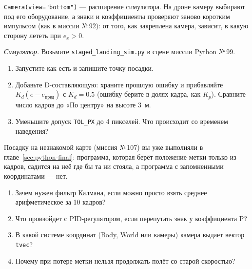 \begin{warnbox}
\verb|Camera(view="bottom")| --- расширение симулятора. На дроне камеру выбирают под его оборудование, а знаки и коэффициенты проверяют заново коротким импульсом (как в миссии №\,92): от того, как закреплена камера, зависит, в какую сторону лететь при $e_x > 0$.
\end{warnbox}

\begin{taskbox}
\emph{Симулятор.} Возьмите \verb|staged_landing_sim.py| в сцене миссии Python №\,99.
\begin{enumerate}
    \item Запустите как есть и запишите точку посадки.
    \item Добавьте D-составляющую: храните прошлую ошибку и прибавляйте $K_d (e - e_{\text{пред}})$ с $K_d = 0.5$ (ошибку берите в долях кадра, как $K_p$). Сравните число кадров до «По центру» на высоте 3~м.
    \item Уменьшите допуск \verb|TOL_PX| до 4 пикселей. Что происходит со временем наведения?
\end{enumerate}
\end{taskbox}

Посадку на незнакомой карте (миссия №\,107) вы уже выполняли в главе~\ref{sec:python-final}: программа, которая берёт положение метки только из кадров, садится на неё где бы та ни стояла, а программа с запомненными координатами --- нет.

\begin{questionbox}
\begin{enumerate}
    \item Зачем нужен фильтр Калмана, если можно просто взять среднее арифметическое за 10 кадров?
    \item Что произойдет с PID-регулятором, если перепутать знак у коэффициента P?
    \item В какой системе координат (Body, World или камеры) камера выдает вектор \texttt{tvec}?
    \item Почему при потере метки нельзя продолжать полёт со старой скоростью?
\end{enumerate}
\end{questionbox}

